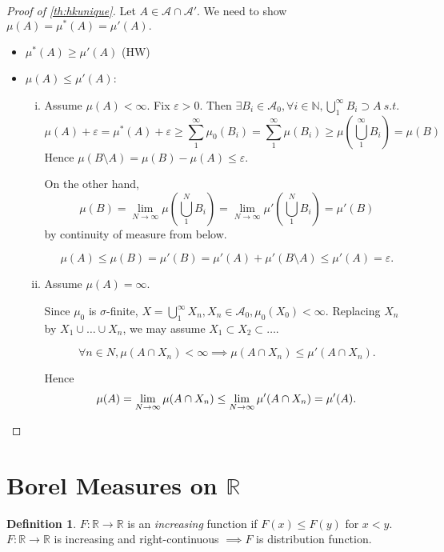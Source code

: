 \documentclass{report}
\newcommand{\R}{\mathbb{R}}
\newcommand{\N}{\mathbb{N}}
\newcommand{\st}{\ s.t.\ }
\theoremstyle{definition}
\newtheorem{definition}[theorem]{Definition}
\theoremstyle{remark}
\newcommand*\ttlmath[2]{\texorpdfstring{$\boldsymbol{#1}$}{#2}}
\begin{document}
\begin{proof}[Proof of \ref{th:hkunique}]
Let $A \in \mathcal{A} \cap \mathcal{A}'$. We need to show $\mu(A) = \mu^*(A) = \mu'(A).$
\begin{itemize}
\item
$\mu^*(A) \geq \mu'(A)$ (HW)

\item
$\mu(A) \leq \mu'(A)$:
\begin{enumerate}[(i)]
\item Assume $\mu(A) < \infty.$ Fix $\varepsilon > 0$. Then $\exists B_i \in \mathcal{A}_0, \forall i \in \N, \bigcup_1^\infty B_i \supset A \st$
\[
\mu(A) + \varepsilon = \mu^*(A) + \varepsilon \geq \sum_1^\infty \mu_0(B_i) = \sum_1^\infty \mu(B_i) \geq \mu \left(\bigcup_1^\infty B_i\right) = \mu(B)
\]
Hence $\mu(B \setminus A) = \mu(B) - \mu(A) \leq \varepsilon.$

On the other hand, 
\[
\mu(B) = \lim_{N \to \infty} \mu\left(\bigcup_1^N B_i\right) = \lim_{N \to \infty} \mu'\left(\bigcup_1^N B_i\right) = \mu'(B)
\]
by continuity of measure from below.

\[
\mu(A) \leq \mu(B) = \mu'(B) = \mu'(A) + \mu'(B \setminus A) \leq \mu'(A) = \varepsilon.
\]
\item
Assume $\mu(A) = \infty.$

Since $\mu_0$ is $\sigma$-finite, $X = \bigcup_1^\infty X_n, X_n \in \mathcal{A}_0, \mu_0(X_0) < \infty.$
Replacing $X_n$ by $X_1 \cup \ldots \cup X_n$, we may assume $X_1 \subset X_2 \subset \ldots$.

\[\forall n \in N, \mu(A \cap X_n) < \infty \implies \mu(A \cap X_n) \leq \mu'(A \cap X_n).\]

Hence
\[
\mu(A) = \lim_{N \to \infty} \mu(A \cap X_n) \leq \lim_{N \to \infty} \mu'(A \cap X_n) = \mu'(A). \qedhere
\]
\end{enumerate}
\end{itemize}
\end{proof}

\section{Borel Measures on \ttlmath{\R}{Reals}}
\begin{definition}
$F: \R \to \R$ is an \emph{increasing} function if $F(x) \leq F(y)$ for $x < y$.
$F: \R \to \R$ is increasing and right-continuous $\implies F$ is distribution function. 
\end{definition}
\end{document}
